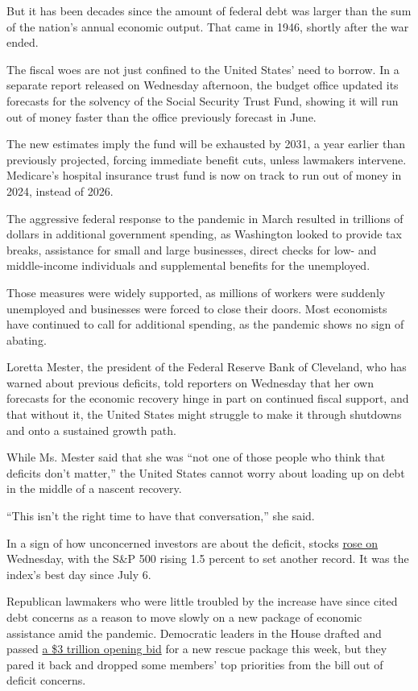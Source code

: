 But it has been decades since the amount of federal debt was larger than
the sum of the nation's annual economic output. That came in 1946,
shortly after the war ended.

The fiscal woes are not just confined to the United States' need to
borrow. In a separate report released on Wednesday afternoon, the budget
office updated its forecasts for the solvency of the Social Security
Trust Fund, showing it will run out of money faster than the office
previously forecast in June.

The new estimates imply the fund will be exhausted by 2031, a year
earlier than previously projected, forcing immediate benefit cuts,
unless lawmakers intervene. Medicare's hospital insurance trust fund is
now on track to run out of money in 2024, instead of 2026.

The aggressive federal response to the pandemic in March resulted in
trillions of dollars in additional government spending, as Washington
looked to provide tax breaks, assistance for small and large businesses,
direct checks for low- and middle-income individuals and supplemental
benefits for the unemployed.

Those measures were widely supported, as millions of workers were
suddenly unemployed and businesses were forced to close their doors.
Most economists have continued to call for additional spending, as the
pandemic shows no sign of abating.

Loretta Mester, the president of the Federal Reserve Bank of Cleveland,
who has warned about previous deficits, told reporters on Wednesday that
her own forecasts for the economic recovery hinge in part on continued
fiscal support, and that without it, the United States might struggle to
make it through shutdowns and onto a sustained growth path.

While Ms. Mester said that she was ``not one of those people who think
that deficits don't matter,'' the United States cannot worry about
loading up on debt in the middle of a nascent recovery.

``This isn't the right time to have that conversation,'' she said.

In a sign of how unconcerned investors are about the deficit, stocks
\href{https://www.wsj.com/articles/global-stock-markets-dow-update-9-02-2020-11599039549}{rose
on} Wednesday, with the S\&P 500 rising 1.5 percent to set another
record. It was the index's best day since July 6.

Republican lawmakers who were little troubled by the increase have since
cited debt concerns as a reason to move slowly on a new package of
economic assistance amid the pandemic. Democratic leaders in the House
drafted and passed
\href{https://www.nytimes3xbfgragh.onion/2020/05/15/us/politics/house-simulus-vote.html}{a
\$3 trillion opening bid} for a new rescue package this week, but they
pared it back and dropped some members' top priorities from the bill out
of deficit concerns.

